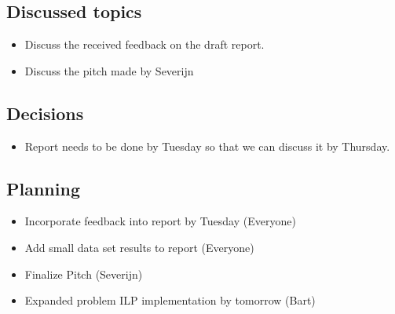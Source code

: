\documentclass{article}
\begin{document}
\subsection*{Discussed topics}
\begin{itemize}
    \item Discuss the received feedback on the draft report.
    \item Discuss the pitch made by Severijn
\end{itemize}

\subsection*{Decisions}
\begin{itemize}
    \item Report needs to be done by Tuesday so that we can discuss it by Thursday. 
\end{itemize}

\subsection*{Planning}
\begin{itemize}
    \item Incorporate feedback into report by Tuesday (Everyone)
    \item Add small data set results to report (Everyone)
    \item Finalize Pitch (Severijn)
    \item Expanded problem ILP implementation by tomorrow (Bart)
\end{itemize}
\end{document}
